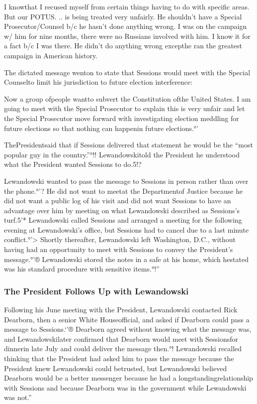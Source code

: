 {I knowthat I recused myself from certain things having to do with specific areas.
But our POTUS. .. is being treated very unfairly.
He shouldn’t have a Special Prosecutor/Counsel b/c he hasn’t done anything wrong.
I was on the campaign w/ him for nine months, there were no Russians involved with him.
I know it for a fact b/c I was there.
He didn’t do anything wrong excepthe ran the greatest campaign in American history.

The dictated message wenton to state that Sessions would meet with the Special Counselto limit his jurisdiction to future election interference:

Now a group ofpeople wantto subvert the Constitution ofthe United States.
I am going to meet with the Special Prosecutor to explain this is very unfair and let the Special Prosecutor move forward with investigating election meddling for future elections so that nothing can happenin future elections.°'

ThePresidentsaid that if Sessions delivered that statement he would be the “most popular guy in the country.”°!!
Lewandowskitold the President he understood what the President wanted Sessions to do.5!?

Lewandowski wanted to pass the message to Sessions in person rather than over the phone.°'?
He did not want to meetat the Departmentof Justice because he did not want a public log of his visit and did not want Sessions to have an advantage over him by meeting on what Lewandowski described as Sessions’s turf.5'*
Lewandowski called Sessions and arranged a meeting for the following evening at Lewandowski’s office, but Sessions had to cancel due to a last minute conflict.°'>
Shortly thereafter, Lewandowski left Washington, D.C., without having had an opportunity to meet with Sessions to convey the President’s message.°'®
Lewandowski stored the notes in a safe at his home, which hestated was his standard procedure with sensitive items.°!”

\subsubsection{The President Follows Up with Lewandowski}

Following his June meeting with the President, Lewandowski contacted Rick Dearborn, then a senior White Houseofficial, and asked if Dearborn could pass a message to Sessions.‘'®
Dearborn agreed without knowing what the message was, and Lewandowskilater confirmed that Dearborn would meet with Sessionsfor dinnerin late July and could deliver the message then.°!
Lewandowski recalled thinking that the President had asked him to pass the message because the President knew Lewandowski could betrusted, but Lewandowski believed Dearborn would be a better messenger because he had a longstandingrelationship with Sessions and because Dearborn was in the government while Lewandowski was not.”

}
